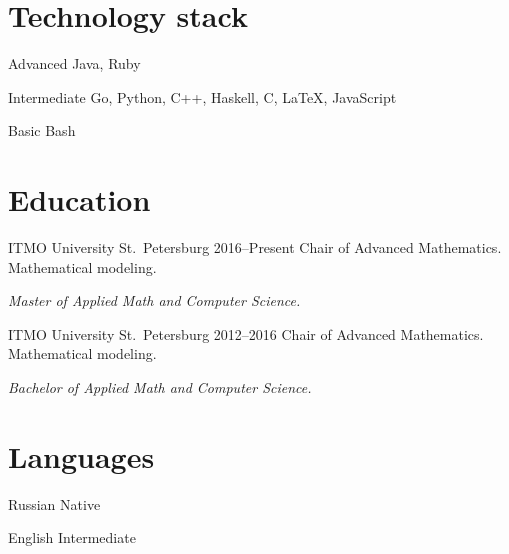 \documentclass{cv}
\begin{document}
\section{Technology stack}

\begin{cvblock}{Advanced}
  Java, Ruby
\end{cvblock}

\begin{cvblock}{Intermediate}
  Go, Python, C++, Haskell, C, \LaTeX, JavaScript
\end{cvblock}

\begin{cvblock}{Basic}
  Bash
\end{cvblock}

\section{Education}

\begin{cvblock}{%
  \blocktitle
    {ITMO University}
    {St.~Petersburg}
    {}
    {2016--Present}}
  Chair of Advanced Mathematics. Mathematical modeling.
  \vspace{1em}

  \textit{Master of Applied Math and Computer Science.}
\end{cvblock}

\begin{cvblock}{%
  \blocktitle
    {ITMO University}
    {St.~Petersburg}
    {}
    {2012--2016}}
  Chair of Advanced Mathematics. Mathematical modeling.
  \vspace{1em}

  \textit{Bachelor of Applied Math and Computer Science.}
\end{cvblock}

\section{Languages}

\begin{cvblock}{Russian}
  Native
\end{cvblock}

\begin{cvblock}{English}
  Intermediate
\end{cvblock}
\end{document}
